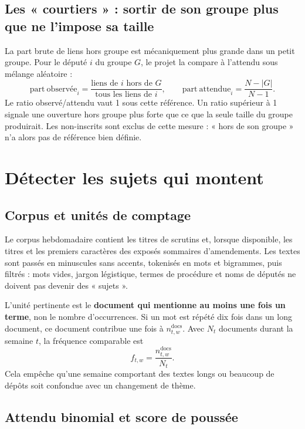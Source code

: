 \documentclass[11pt,a4paper]{article}
\begin{document}
\subsection{Les « courtiers » : sortir de son groupe plus que ne l'impose sa taille}

La part brute de liens hors groupe est mécaniquement plus grande dans un petit
groupe. Pour le député $i$ du groupe $G$, le projet la compare à l'attendu sous
mélange aléatoire :
\[
 \mathrm{part\ observée}_i=\frac{\text{liens de $i$ hors de $G$}}
 {\text{tous les liens de $i$}},\qquad
 \mathrm{part\ attendue}_i=\frac{N-|G|}{N-1}.
\]
Le ratio observé/attendu vaut 1 sous cette référence. Un ratio supérieur à 1
signale une ouverture hors groupe plus forte que ce que la seule taille du groupe
produirait. Les non-inscrits sont exclus de cette mesure : « hors de son groupe »
n'a alors pas de référence bien définie.

\section{Détecter les sujets qui montent}

\subsection{Corpus et unités de comptage}

Le corpus hebdomadaire contient les titres de scrutins et, lorsque disponible,
les titres et les premiers caractères des exposés sommaires d'amendements. Les
textes sont passés en minuscules sans accents, tokenisés en mots et bigrammes,
puis filtrés : mots vides, jargon légistique, termes de procédure et noms de
députés ne doivent pas devenir des « sujets ».

L'unité pertinente est le \textbf{document qui mentionne au moins une fois un
terme}, non le nombre d'occurrences. Si un mot est répété dix fois dans un long
document, ce document contribue une fois à $n_{t,w}^{\mathrm{docs}}$. Avec
$N_t$ documents durant la semaine $t$, la fréquence comparable est
\[
 f_{t,w}=\frac{n_{t,w}^{\mathrm{docs}}}{N_t}.
\]
Cela empêche qu'une semaine comportant des textes longs ou beaucoup de dépôts
soit confondue avec un changement de thème.

\subsection{Attendu binomial et score de poussée}
\end{document}
